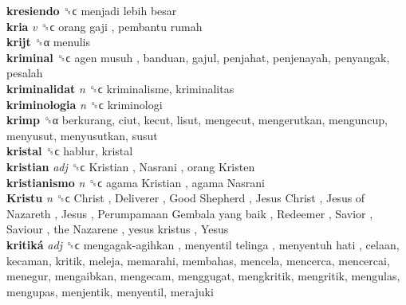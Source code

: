 \textbf{kresiendo} ␝ϲ   menjadi lebih besar   \\
\textbf{kria} \emph{v}  ␝ϲ   orang gaji ,  pembantu rumah   \\
\textbf{krijt} ␝α  menulis  \\
\textbf{kriminal} ␝ϲ   agen musuh , banduan, gajul, penjahat, penjenayah, penyangak, pesalah  \\
\textbf{kriminalidat} \emph{n}  ␝ϲ  kriminalisme, kriminalitas  \\
\textbf{kriminologia} \emph{n}  ␝ϲ  kriminologi  \\
\textbf{krimp} ␝α  berkurang, ciut, kecut, lisut, mengecut, mengerutkan, menguncup, menyusut, menyusutkan, susut  \\
\textbf{kristal} ␝ϲ  hablur, kristal  \\
\textbf{kristian} \emph{adj}  ␝ϲ   Kristian ,  Nasrani ,  orang Kristen   \\
\textbf{kristianismo} \emph{n}  ␝ϲ   agama Kristian ,  agama Nasrani   \\
\textbf{Kristu} \emph{n}  ␝ϲ   Christ ,  Deliverer ,  Good Shepherd ,  Jesus Christ ,  Jesus of Nazareth ,  Jesus ,  Perumpamaan Gembala yang baik ,  Redeemer ,  Savior ,  Saviour ,  the Nazarene ,  yesus kristus ,  Yesus   \\
\textbf{kritiká} \emph{adj}  ␝ϲ   mengagak-agihkan ,  menyentil telinga ,  menyentuh hati , celaan, kecaman, kritik, meleja, memarahi, membahas, mencela, mencerca, mencercai, menegur, mengaibkan, mengecam, menggugat, mengkritik, mengritik, mengulas, mengupas, menjentik, menyentil, merajuki  \\
